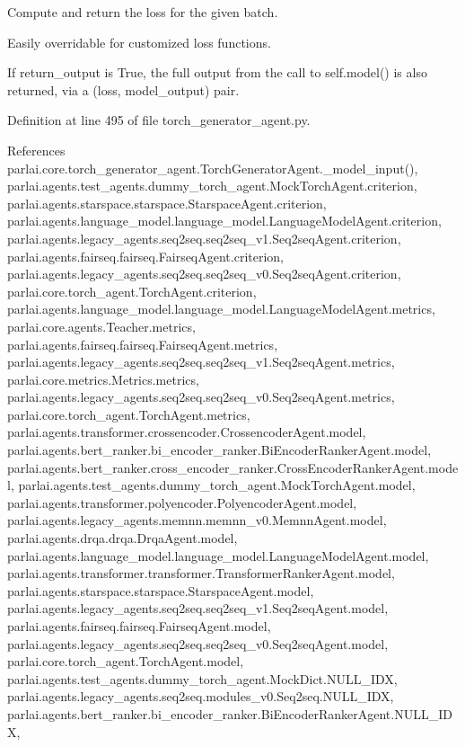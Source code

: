 \begin{DoxyVerb}Compute and return the loss for the given batch.

Easily overridable for customized loss functions.

If return_output is True, the full output from the call to self.model()
is also returned, via a (loss, model_output) pair.
\end{DoxyVerb}
 

Definition at line 495 of file torch\+\_\+generator\+\_\+agent.\+py.



References parlai.\+core.\+torch\+\_\+generator\+\_\+agent.\+Torch\+Generator\+Agent.\+\_\+model\+\_\+input(), parlai.\+agents.\+test\+\_\+agents.\+dummy\+\_\+torch\+\_\+agent.\+Mock\+Torch\+Agent.\+criterion, parlai.\+agents.\+starspace.\+starspace.\+Starspace\+Agent.\+criterion, parlai.\+agents.\+language\+\_\+model.\+language\+\_\+model.\+Language\+Model\+Agent.\+criterion, parlai.\+agents.\+legacy\+\_\+agents.\+seq2seq.\+seq2seq\+\_\+v1.\+Seq2seq\+Agent.\+criterion, parlai.\+agents.\+fairseq.\+fairseq.\+Fairseq\+Agent.\+criterion, parlai.\+agents.\+legacy\+\_\+agents.\+seq2seq.\+seq2seq\+\_\+v0.\+Seq2seq\+Agent.\+criterion, parlai.\+core.\+torch\+\_\+agent.\+Torch\+Agent.\+criterion, parlai.\+agents.\+language\+\_\+model.\+language\+\_\+model.\+Language\+Model\+Agent.\+metrics, parlai.\+core.\+agents.\+Teacher.\+metrics, parlai.\+agents.\+fairseq.\+fairseq.\+Fairseq\+Agent.\+metrics, parlai.\+agents.\+legacy\+\_\+agents.\+seq2seq.\+seq2seq\+\_\+v1.\+Seq2seq\+Agent.\+metrics, parlai.\+core.\+metrics.\+Metrics.\+metrics, parlai.\+agents.\+legacy\+\_\+agents.\+seq2seq.\+seq2seq\+\_\+v0.\+Seq2seq\+Agent.\+metrics, parlai.\+core.\+torch\+\_\+agent.\+Torch\+Agent.\+metrics, parlai.\+agents.\+transformer.\+crossencoder.\+Crossencoder\+Agent.\+model, parlai.\+agents.\+bert\+\_\+ranker.\+bi\+\_\+encoder\+\_\+ranker.\+Bi\+Encoder\+Ranker\+Agent.\+model, parlai.\+agents.\+bert\+\_\+ranker.\+cross\+\_\+encoder\+\_\+ranker.\+Cross\+Encoder\+Ranker\+Agent.\+model, parlai.\+agents.\+test\+\_\+agents.\+dummy\+\_\+torch\+\_\+agent.\+Mock\+Torch\+Agent.\+model, parlai.\+agents.\+transformer.\+polyencoder.\+Polyencoder\+Agent.\+model, parlai.\+agents.\+legacy\+\_\+agents.\+memnn.\+memnn\+\_\+v0.\+Memnn\+Agent.\+model, parlai.\+agents.\+drqa.\+drqa.\+Drqa\+Agent.\+model, parlai.\+agents.\+language\+\_\+model.\+language\+\_\+model.\+Language\+Model\+Agent.\+model, parlai.\+agents.\+transformer.\+transformer.\+Transformer\+Ranker\+Agent.\+model, parlai.\+agents.\+starspace.\+starspace.\+Starspace\+Agent.\+model, parlai.\+agents.\+legacy\+\_\+agents.\+seq2seq.\+seq2seq\+\_\+v1.\+Seq2seq\+Agent.\+model, parlai.\+agents.\+fairseq.\+fairseq.\+Fairseq\+Agent.\+model, parlai.\+agents.\+legacy\+\_\+agents.\+seq2seq.\+seq2seq\+\_\+v0.\+Seq2seq\+Agent.\+model, parlai.\+core.\+torch\+\_\+agent.\+Torch\+Agent.\+model, parlai.\+agents.\+test\+\_\+agents.\+dummy\+\_\+torch\+\_\+agent.\+Mock\+Dict.\+N\+U\+L\+L\+\_\+\+I\+DX, parlai.\+agents.\+legacy\+\_\+agents.\+seq2seq.\+modules\+\_\+v0.\+Seq2seq.\+N\+U\+L\+L\+\_\+\+I\+DX, parlai.\+agents.\+bert\+\_\+ranker.\+bi\+\_\+encoder\+\_\+ranker.\+Bi\+Encoder\+Ranker\+Agent.\+N\+U\+L\+L\+\_\+\+I\+DX, 
